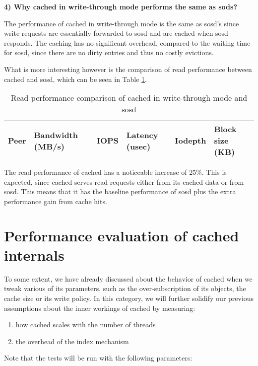 \textbf{4) Why cached in write-through mode performs the same as sods?}

The performance of cached in write-through mode is the same as sosd's since 
write requests are essentially forwarded to sosd and are cached when sosd 
responds. The caching has no significant overhead, compared to the waiting time 
for sosd, since there are no dirty entries and thus no costly evictions.

What is more interesting however is the comparison of read performance between 
cached and sosd, which can be seen in Table \ref{tab:writethrough}.

\begin{table}[H]
	\centering
	\begin{tabular}{ | l | l | l | l | l | l |}
		\hline
		Peer& Bandwidth (MB/s) & IOPS	& Latency (usec) & Iodepth & Block size 
		(KB) \\
		\hline \hline
		
		
	\end{tabular}
	\caption{Read performance comparison of cached in write-through mode and 
		sosd}
	\label{tab:writethrough}
\end{table}

The read performance of cached has a noticeable increase of 25\%. This is 
expected, since cached serves read requests either from its cached data or from 
sosd. This means that it has the baseline performance of sosd plus the extra 
performance gain from cache hits.

\section{Performance evaluation of cached internals}\label{sec:internals-plot}

To some extent, we have already discussed about the behavior of cached when we 
tweak various of its parameters, such as the over-subscription of its objects, 
the cache size or its write policy. In this category, we will further solidify 
our previous assumptions about the inner workings of cached by measuring:

\begin{enumerate}
	\item how cached scales with the number of threads
	\item the overhead of the index mechanism
\end{enumerate}

Note that the tests will be run with the following parameters:

